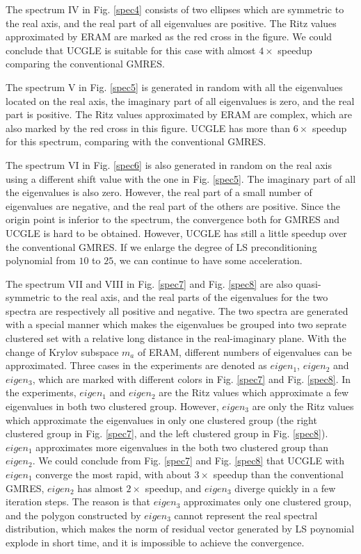 The spectrum IV in Fig. \ref{spec4} consists of two ellipses which are symmetric to the real axis, and the real part of all eigenvalues are positive. The Ritz values approximated by ERAM are marked as the red cross in the figure. We could conclude that UCGLE is suitable for this case with almost $4\times$ speedup comparing the conventional GMRES. 

The spectrum V in Fig. \ref{spec5} is generated in random with all the eigenvalues located on the real axis, the imaginary part of all eigenvalues is zero, and the real part is positive. The Ritz values approximated by ERAM are complex, which are also marked by the red cross in this figure. UCGLE has more than $6\times$ speedup for this spectrum, comparing with the conventional GMRES.

The spectrum VI in Fig. \ref{spec6} is also generated in random on the real axis using a different shift value with the one in  Fig. \ref{spec5}. The imaginary part of all the eigenvalues is also zero. However, the real part of a small number of eigenvalues are negative, and the real part of the others are positive. Since the origin point is inferior to the spectrum, the convergence both for GMRES and UCGLE is hard to be obtained. However, UCGLE has still a little speedup over the conventional GMRES. If we enlarge the degree of LS preconditioning polynomial from $10$ to $25$, we can continue to have some acceleration.

The spectrum VII and VIII  in Fig. \ref{spec7} and Fig. \ref{spec8} are also quasi-symmetric to the real axis, and the real parts of the eigenvalues for the two spectra are respectively all positive and negative. The two spectra are generated with a special manner which makes the eigenvalues be grouped into two seprate clustered set with a relative long distance in the real-imaginary plane. With the change of Krylov subspace $m_a$ of ERAM, different numbers of eigenvalues can be approximated. Three cases in the experiments are denoted as $eigen_1$, $eigen_2$ and $eigen_3$, which are marked with different colors in Fig. \ref{spec7} and Fig. \ref{spec8}. In the experiments, $eigen_1$ and $eigen_2$ are the Ritz values which approximate a few eigenvalues in both two clustered group. However, $eigen_3$ are only the Ritz values which approximate the eigenvalues in only one clustered group (the right clustered group in Fig. \ref{spec7}, and the left clustered group in Fig. \ref{spec8}). $eigen_1$ approximates more eigenvalues in the both two clustered group than $eigen_2$.  We could conclude from  Fig. \ref{spec7} and Fig. \ref{spec8} that UCGLE with $eigen_1$ converge the most rapid, with about $3\times$ speedup than the conventional GMRES, $eigen_2$ has almost $2\times$ speedup, and $eigen_3$ diverge quickly in a few iteration steps. The reason is that $eigen_3$ approximates only one clustered group, and the polygon constructed by $eigen_3$ cannot represent the real spectral distribution, which makes the norm of residual vector generated by LS poynomial explode in short time, and it is impossible to achieve the convergence.

